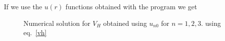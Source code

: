 \documentclass[12pt]{article}
\begin{document}
If we use the $u(r)$ functions obtained with the program we get
\begin{figure}[h!]
    \centering
    \caption{Numerical solution for $V_H$ obtained using $u_{n0}$ for $n=1,2,3$. using eq.~\ref{vh} }
\label{results}
\end{figure}
\clearpage
\end{document}
